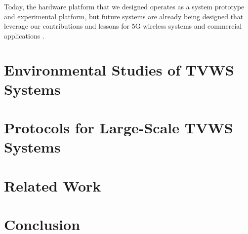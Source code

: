 \documentclass[oneside,12pt]{Ricethesis_PDF}
\begin{document}
	Today, the hardware platform that we designed operates as a system prototype and experimental platform, but future systems are already being designed that leverage our contributions and lessons for 5G wireless systems and commercial applications \cite{shepard2017argosv3}.


\chapter{Environmental Studies of TVWS Systems}
\label{sec_env_study_chapter}





		


\chapter{Protocols for Large-Scale TVWS Systems}
\label{sec_protocols_chapter}



\chapter{Related Work}
\label{sec_related_chapter}


\chapter{Conclusion}
\label{sec_conclusion_chapter}


%
%
%
%

%
\end{document}
